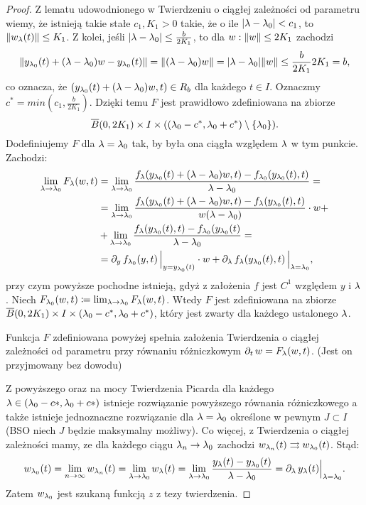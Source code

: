\begin{proof}
	Z lematu udowodnionego w Twierdzeniu o ciągłej zależności od parametru wiemy, że istnieją takie stałe $c_1, K_1 > 0$ 
	takie, że o ile $\abs{ \l - \l_0 } < c_1$, to $\norm{ w_\l(t) } \le K_1$. Z kolei, jeśli $\abs{ \l - \l_0 } \le 
	\frac{ b }{ 2K_1 }$, 
	to dla $w : \lVert w \rVert \le 2K_1$ zachodzi
%
	\begin{equation*}
  	\norm{ y_{\l_0}(t) + (\l - \l_0)w - y_{\l_0}(t) } = \norm { (\l - \l_0)w  } = \abs{ \l - \l_0 } \norm{ w } \le
  	\frac{ b }{ 2K_1 } 2K_1 = b ,
	\end{equation*}
%
	co oznacza, że $( y_{\l_0}(t) + (\l - \l_0)w, t) \in R_b$ dla każdego $t \in I$. Oznaczmy $c^* = min(c_1, \frac{ b }{ 
	2K_1 } )$. Dzięki temu $F$ jest prawidłowo zdefiniowana na zbiorze
%
	\begin{equation*}
	  \overline{B}(0, 2K_1) \times I \times ( (\l_0 - c^*, \l_0 + c^*) \setminus \{ \l_0 \} ) \text{.}
	\end{equation*}
%
	Dodefiniujemy $F$ dla $\l = \l_0$ tak, by była ona ciągła względem $\l$ w tym punkcie. Zachodzi:
%
	\begin{align*}
  	\lim_{\l \to \l_0} F_\l(w, t) &= \lim_{\l \to \l_0} \frac{ f_\l(y_{\l_0}(t) + (\l - \l_0)w, t) -  
  	f_{\l_0}(y_{\l_0}(t), t) }{ \l - \l_0 } = \\
  	&=  \lim_{\l \to \l_0} \frac{ f_\l(y_{\l_0}(t) + (\l - \l_0)w, t) -  f_\l (y_{\l_0}(t), t) }{ w(\l - \l_0) } \cdot 
  	w 
  	+ \\
  	&+ \lim_{\l \to \l_0} \frac{ f_\l(y_{\l_0}(t), t) -  f_{\l_0}(y_{\l_0}(t) }{ \l - \l_0 } = \\
  	&= \pd{ y } f_{\l_0} (y, t) \, \Big\vert_{ y = y_{\l_0}(t) } \cdot w + \pd{ \l } f_{\l}( y_{\l_0}(t), t) \, 
  	\Big\vert_{ \l = \l_0 } \text{,}
	\end{align*}
%
	przy czym powyższe pochodne istnieją, gdyż z założenia $f$ jest $C^1$ względem $y$ i $\l$. Niech $F_{\l_0}(w, t) 
	\coloneqq \lim_{\l \to \l_0} F_\l(w, t)$. Wtedy $F$ jest zdefiniowana na zbiorze $\overline{B}(0, 2K_1) \times I 
	\times (\l_0 - c^*, \l_0 + c^*)$, który jest zwarty dla każdego ustalonego $\l$.
%
	\begin{nestedlemma}
		Funkcja $F$ zdefiniowana powyżej spełnia założenia Twierdzenia o ciągłej zależności od parametru przy równaniu 
		różniczkowym $\pd{t} w = F_\l(w, t)$. (Jest on przyjmowany bez dowodu)
	\end{nestedlemma}		
%
	Z powyższego oraz na mocy Twierdzenia Picarda dla każdego $\l \in  (\l_0 - c*, \l_0 + c*)$ istnieje rozwiązanie
	powyższego równania różniczkowego a także istnieje jednoznaczne rozwiązanie dla $\l = \l_0$ określone
	w pewnym $J \subset I$ (BSO niech $J$ będzie maksymalny możliwy). Co więcej, z Twierdzenia
	o ciągłej zależności mamy, ze dla każdego ciągu $\l_n \to \l_0$ zachodzi $w_{\l_n}(t) \rightrightarrows w_{\l_0}(t)$.
	Stąd:
%
	\begin{equation*}
  	w_{\l_0}(t) = \lim_{n \to \infty} w_{\l_n}(t) = \lim_{\l \to \l_0} w_{\l}(t) = \lim_{\l \to \l_0} \frac{ y_\l(t) - 
  	y_{\l_0}(t) }{ \l - \l_0 } = \pd{ \l } y_\l(t) \Big\vert_{ \l = \l_0 } \text{.}
	\end{equation*}
%
	Zatem $w_{\l_0}$ jest szukaną funkcją $z$ z tezy twierdzenia.
	

\end{proof}
